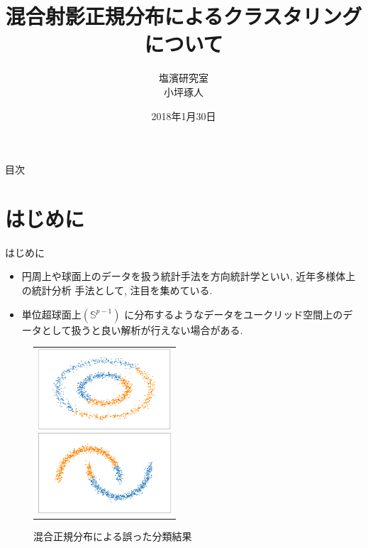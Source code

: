 \documentclass[dvipdfmx]{beamer} %
\title[タイトル]{混合射影正規分布によるクラスタリングについて}
\author[発表者名]{塩濱研究室\\ 小坪琢人}
\institute[所属]{東京理科大学\ 工学部経営工学科4年\\学籍番号 4414036}
\date[日付]{2018年1月30日}
\begin{document}
\begin{frame}[plain]
\titlepage
\end{frame}

\begin{frame}{目次}
\tableofcontents
\end{frame}

\section{はじめに}
\begin{frame}{はじめに}

\begin{itemize}

\item 
円周上や球面上のデータを扱う統計手法を方向統計学といい, 近年多様体上の統計分析
手法として, 注目を集めている.

\item 
単位超球面上$(\mathbb{S}^{p-1})$ に分布するようなデータをユークリッド空間上のデータとして扱うと良い解析が行えない場合がある.

\end{itemize}

\begin{figure}[H]
 \begin{tabular}{c}
 \begin{minipage}{0.5\hsize}
  \begin{center}
   \includegraphics[clip,height= 30mm]{data/sample_mixture_miss2.png}
  \end{center}
 \end{minipage}
 \begin{minipage}{0.5\hsize}
  \begin{center}
 \includegraphics[clip,height= 30mm]{data/sample_mixture_miss1.png}
  \end{center}
 \end{minipage}
\end{tabular}
\caption{混合正規分布による誤った分類結果}
\end{figure}

\end{frame}
\end{document}
